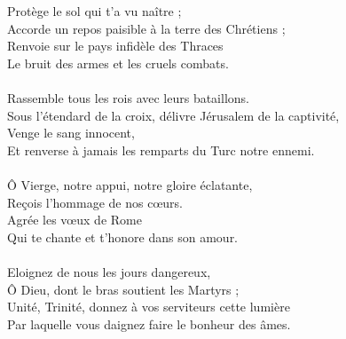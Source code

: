 Protège le sol qui t'a vu naître ;\\
Accorde un repos paisible à la terre des Chrétiens ;\\
Renvoie sur le pays infidèle des Thraces\\
Le bruit des armes et les cruels combats.\\
\\
Rassemble tous les rois avec leurs bataillons.\\
Sous l'étendard de la croix, délivre Jérusalem de la captivité,\\
Venge le sang innocent,\\
Et renverse à jamais les remparts du Turc notre ennemi.\\
\\
Ô Vierge, notre appui, notre gloire éclatante,\\
Reçois l'hommage de nos cœurs.\\
Agrée les vœux de Rome\\
Qui te chante et t'honore dans son amour.\\
\\
Eloignez de nous les jours dangereux,\\
Ô Dieu, dont le bras soutient les Martyrs ;\\
Unité, Trinité, donnez à vos serviteurs cette lumière\\
Par laquelle vous daignez faire le bonheur des âmes.